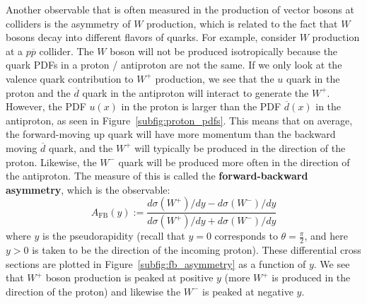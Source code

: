 \documentclass[11pt, oneside]{article}   	%
\theoremstyle{definition}
\numberwithin{equation}{subsection}		%
\begin{document}
Another observable that is often measured in the production of vector bosons at colliders is the asymmetry of $W$ production, which 
is related to the fact that $W$ bosons decay into different flavors of quarks. For example, consider $W$ production at a $p\overline p$ collider. 
The $W$ boson will not be produced isotropically because the quark PDFs in a proton / antiproton are not the same. If we only look 
at the valence quark contribution to $W^+$ production, we see that the $u$ quark in the proton and the $\overline d$ quark in the 
antiproton will interact to generate the $W^+$. However, the PDF $u(x)$ in the proton is larger than the PDF $\overline d(x)$ in the 
antiproton, as seen in Figure~\ref{subfig:proton_pdfs}. This means that on average, the forward-moving up quark will have more momentum 
than the backward moving $\overline d$ quark, and the $W^+$ will typically be produced in the direction of the proton. Likewise, the $W^-$ 
quark will be produced more often in the direction of the antiproton. The measure of this is called the \textbf{forward-backward asymmetry}, 
which is the observable:
\begin{equation}
	A_\mathrm{FB}(y) := \frac{d\sigma(W^+) / dy - d\sigma(W^-) / dy}{d\sigma(W^+) / dy + d\sigma(W^-) / dy}
\end{equation}
where $y$ is the pseudorapidity (recall that $y = 0$ corresponds to $\theta = \frac{\pi}{2}$, and here $y > 0$ is taken to be the direction of the 
incoming proton). These differential cross sections are plotted in Figure~\ref{subfig:fb_asymmetry} as a function of 
$y$. We see that $W^+$ boson production is peaked at positive $y$ (more $W^+$ is produced in the direction of the proton) and likewise 
the $W^-$ is peaked at negative $y$. 
\end{document}
